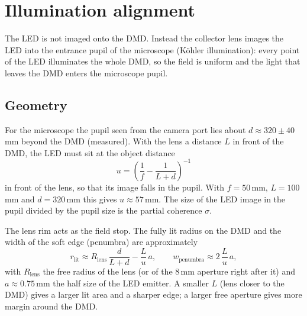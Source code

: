 \documentclass[11pt,a4paper]{article}
\begin{document}
\section{Illumination alignment}
\label{sec:illum}
The LED is not imaged onto the DMD. Instead the collector lens images the LED into the entrance pupil of the
microscope (K\"ohler illumination): every point of the LED illuminates the whole DMD, so the field is uniform and the
light that leaves the DMD enters the microscope pupil.

\subsection{Geometry}
For the microscope the pupil seen from the camera port lies about $d \approx 320 \pm 40$\,mm beyond the DMD (measured).
With the lens a distance $L$ in front of the DMD, the LED must sit at the object distance
\begin{equation}
  u = \left(\frac{1}{f} - \frac{1}{L + d}\right)^{-1}
\end{equation}
in front of the lens, so that its image falls in the pupil. With $f = 50$\,mm, $L = 100$\,mm and $d = 320$\,mm this
gives $u \approx 57$\,mm. The size of the LED image in the pupil divided by the pupil size is the partial coherence
$\sigma$.

The lens rim acts as the field stop. The fully lit radius on the DMD and the width of the soft edge (penumbra) are
approximately
\begin{equation}
  r_\text{lit} \approx R_\text{lens}\,\frac{d}{L + d} - \frac{L}{u}\,a, \qquad
  w_\text{penumbra} \approx 2\,\frac{L}{u}\,a,
\end{equation}
with $R_\text{lens}$ the free radius of the lens (or of the 8\,mm aperture right after it) and $a \approx 0.75$\,mm the
half size of the LED emitter. A smaller $L$ (lens closer to the DMD) gives a larger lit area and a sharper edge; a
larger free aperture gives more margin around the DMD.
\end{document}
